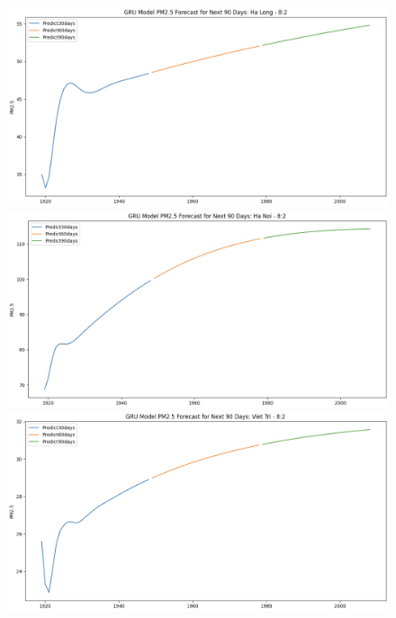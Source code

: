 \begin{figure}[H]
        \begin{minipage}{0.15\textwidth}
            \centering
            \includegraphics[width=1\textwidth]{img/final/GRU/90D/GRU_8_2_HL_90D.png}
            \end{minipage}
            \hfill
            \begin{minipage}{0.15\textwidth}
            \centering
            \includegraphics[width=1\textwidth]{img/final/GRU/90D/GRU_8_2_HN_90D.png}
            \end{minipage}
            \hfill
            \begin{minipage}{0.15\textwidth}
            \centering
            \includegraphics[width=1\textwidth]{img/final/GRU/90D/GRU_8_2_VT_90D.png}
            \end{minipage}
            \hfill
    

\end{figure}
